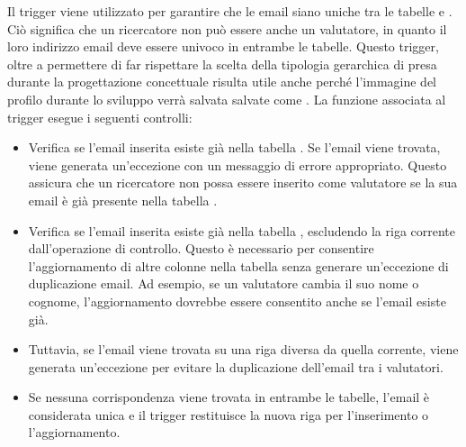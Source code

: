 \documentclass{report}
\begin{document}
Il trigger  viene utilizzato per garantire che le email siano uniche tra le tabelle  e . Ciò significa che un ricercatore non può essere anche un valutatore, in quanto il loro indirizzo email deve essere univoco in entrambe le tabelle.  Questo trigger, oltre a permettere di far rispettare la scelta della tipologia gerarchica di  presa durante la progettazione concettuale risulta utile anche perché l'immagine del profilo durante lo sviluppo verrà salvata salvate come . La funzione associata al trigger esegue i seguenti controlli:
\begin{itemize}
\item Verifica se l'email inserita esiste già nella tabella . Se l'email viene trovata, viene generata un'eccezione con un messaggio di errore appropriato. Questo assicura che un ricercatore non possa essere inserito come valutatore se la sua email è già presente nella tabella .
\item Verifica se l'email inserita esiste già nella tabella , escludendo la riga corrente dall'operazione di controllo. Questo è necessario per consentire l'aggiornamento di altre colonne nella tabella  senza generare un'eccezione di duplicazione email. Ad esempio, se un valutatore cambia il suo nome o cognome, l'aggiornamento dovrebbe essere consentito anche se l'email esiste già. \item Tuttavia, se l'email viene trovata su una riga diversa da quella corrente, viene generata un'eccezione per evitare la duplicazione dell'email tra i valutatori.
\item Se nessuna corrispondenza viene trovata in entrambe le tabelle, l'email è considerata unica e il trigger restituisce la nuova riga per l'inserimento o l'aggiornamento.
\end{itemize}
\end{document}
